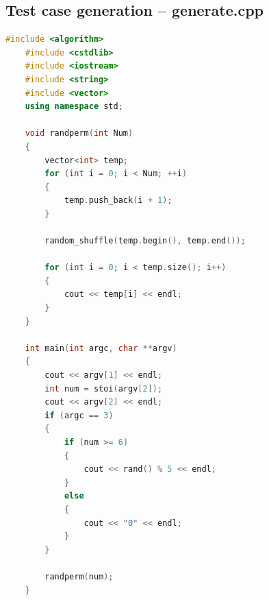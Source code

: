 \documentclass[12pt,a4paper]{article}
\theoremstyle{definition}
\begin{document}
\subsection{Test case generation -- generate.cpp}
\begin{lstlisting}[language=C++]
    #include <algorithm>
    #include <cstdlib>
    #include <iostream>
    #include <string>
    #include <vector>
    using namespace std;

    void randperm(int Num)
    {
        vector<int> temp;
        for (int i = 0; i < Num; ++i)
        {
            temp.push_back(i + 1);
        }

        random_shuffle(temp.begin(), temp.end());

        for (int i = 0; i < temp.size(); i++)
        {
            cout << temp[i] << endl;
        }
    }

    int main(int argc, char **argv)
    {
        cout << argv[1] << endl;
        int num = stoi(argv[2]);
        cout << argv[2] << endl;
        if (argc == 3)
        {
            if (num >= 6)
            {
                cout << rand() % 5 << endl;
            }
            else
            {
                cout << "0" << endl;
            }
        }

        randperm(num);
    }
\end{lstlisting}
\end{document}
